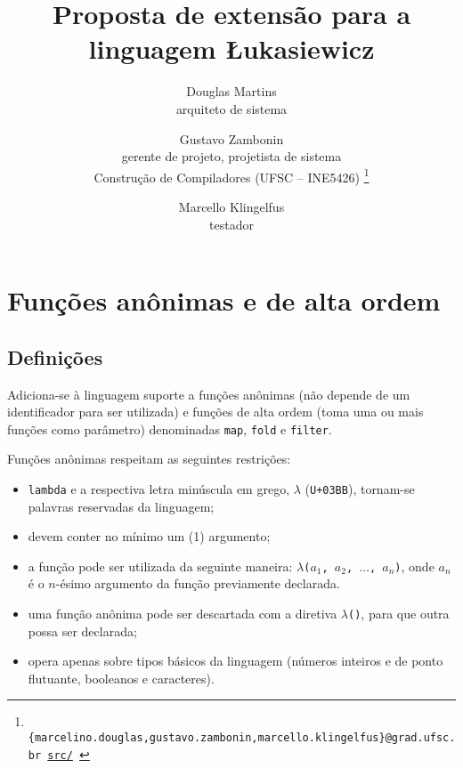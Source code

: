 \documentclass{article}
\title{\textbf{Proposta de extensão para a linguagem Łukasiewicz}}
\author{
    Douglas Martins \\
    {\small arquiteto de sistema}
    \and Gustavo Zambonin \\
    {\small gerente de projeto, projetista de sistema} \vspace{2mm}\\
    {\small Construção de Compiladores (UFSC -- INE5426)}
    \footnote{\texttt{
        \{marcelino.douglas,gustavo.zambonin,marcello.klingelfus\}@grad.ufsc.br
        \hfill \href{https://github.com/zambonin/ufsc-ine5426}{src/}
    }}
    \and Marcello Klingelfus \\
    {\small testador}
}
\date{}
\newenvironment{smallitem}{
    \vspace{-1mm}
    \begin{itemize}
    \setlength{\parskip}{0pt}
    \setlength{\itemsep}{2pt}
}{
    \vspace{-2mm}
    \end{itemize}
}
\begin{document}
\maketitle

\section{Funções anônimas e de alta ordem}

\subsection{Definições}

Adiciona-se à linguagem suporte a funções anônimas (não depende de um
identificador para ser utilizada) e funções de alta ordem (toma uma ou mais
funções como parâmetro) denominadas \texttt{map}, \texttt{fold} e
\texttt{filter}. \medskip

Funções anônimas respeitam as seguintes restrições:
\begin{smallitem}
    \item \texttt{lambda} e a respectiva letra minúscula em grego,
        $\lambda$ (\texttt{U+03BB}), tornam-se palavras reservadas da linguagem;
    \item devem conter no mínimo um (1) argumento;
    \item a função pode ser utilizada da seguinte maneira:
        \texttt{$\lambda$($a_1$, $a_2$, $\dots$, $a_n$)}, onde $a_n$ é o
        $n$-ésimo argumento da função previamente declarada.
    \item uma função anônima pode ser descartada com a diretiva
        \texttt{$\lambda$()}, para que outra possa ser declarada;
    \item opera apenas sobre tipos básicos da linguagem (números inteiros
        e de ponto flutuante, booleanos e caracteres).
\end{smallitem}
\end{document}

